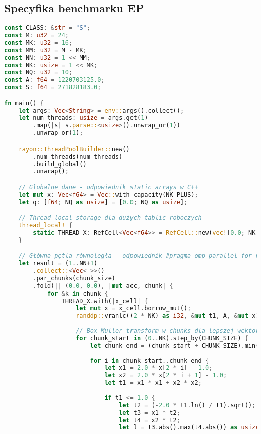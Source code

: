   \subsection{Specyfika benchmarku EP}
  \begin{lstlisting}[language=Rust, caption={Implementacja benchmarku EP w języku Rust}, label={lst:ep_rust}]
const CLASS: &str = "S";
const M: u32 = 24;
const MK: u32 = 16;
const MM: u32 = M - MK;
const NN: u32 = 1 << MM;
const NK: usize = 1 << MK;
const NQ: u32 = 10;
const A: f64 = 1220703125.0;
const S: f64 = 271828183.0;

fn main() {
    let args: Vec<String> = env::args().collect();
    let num_threads: usize = args.get(1)
        .map(|s| s.parse::<usize>().unwrap_or(1))
        .unwrap_or(1);

    rayon::ThreadPoolBuilder::new()
        .num_threads(num_threads)
        .build_global()
        .unwrap();

    // Globalne dane - odpowiednik static arrays w C++
    let mut x: Vec<f64> = Vec::with_capacity(NK_PLUS);
    let q: [f64; NQ as usize] = [0.0; NQ as usize];

    // Thread-local storage dla dużych tablic roboczych
    thread_local! {
        static THREAD_X: RefCell<Vec<f64>> = RefCell::new(vec![0.0; NK_PLUS]);
    }

    // Główna pętla równoległa - odpowiednik #pragma omp parallel for reduction
    let result = (1..NN+1)
        .collect::<Vec<_>>()
        .par_chunks(chunk_size)
        .fold(|| (0.0, 0.0), |mut acc, chunk| {
            for &k in chunk {
                THREAD_X.with(|x_cell| {
                    let mut x = x_cell.borrow_mut();
                    randdp::vranlc((2 * NK) as i32, &mut t1, A, &mut x);
                    
                    // Box-Muller transform w chunks dla lepszej wektoryzacji
                    for chunk_start in (0..NK).step_by(CHUNK_SIZE) {
                        let chunk_end = (chunk_start + CHUNK_SIZE).min(NK);
                        
                        for i in chunk_start..chunk_end {
                            let x1 = 2.0 * x[2 * i] - 1.0;
                            let x2 = 2.0 * x[2 * i + 1] - 1.0;
                            let t1 = x1 * x1 + x2 * x2;
                            
                            if t1 <= 1.0 {
                                let t2 = (-2.0 * t1.ln() / t1).sqrt();
                                let t3 = x1 * t2;
                                let t4 = x2 * t2;
                                let l = t3.abs().max(t4.abs()) as usize;
                                

\end{lstlisting}
